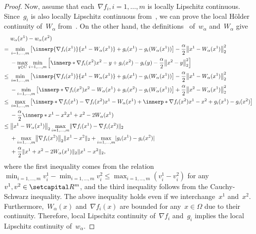 \documentclass[../../main]{subfiles}
\begin{document}
\begin{proof}
               Now, assume that each~$\nabla f_i, i = 1, \dots, m$ is locally Lipschitz continuous.
               Since~$g_i$ is also locally Lipschitz continuous from~, we can prove the local H\"older continuity of~$W_\alpha$ from~.
               On the other hand, the definitions~ of~$w_\alpha$ and~$W_\alpha$ give
               \begin{align} 
                    &w_\alpha(x^1) - w_\alpha(x^2) \\
                   ={}& \min_{i = 1, \dots, m} \left[ \innerp{\nabla f_i(x^1)}{x^1 - W_\alpha(x^1)} + g_i(x^1) - g_i(W_\alpha(x^1)) \right] - \frac{\alpha}{2} \norm*{x^1 - W_\alpha(x^1)}_2^2 \\
                      &- \max_{y \in C} \min_{i = 1, \dots, m} \left[ \innerp*{\nabla f_i(x^2)}{x^2 - y} + g_i(x^2) - g_i(y) - \frac{\alpha}{2} \norm*{x^2 - y}_2^2 \right] \\
                   \le{}& \min_{i = 1, \dots, m} \left[ \innerp{\nabla f_i(x^1)}{x^1 - W_\alpha(x^1)} + g_i(x^1) - g_i(W_\alpha(x^1)) \right] - \frac{\alpha}{2} \norm*{x^1 - W_\alpha(x^1)}_2^2 \\
                        &- \min_{i = 1, \dots, m} \left[ \innerp*{\nabla f_i(x^2)}{x^2 - W_\alpha(x^1)} + g_i(x^2) - g_i(W_\alpha(x^1)) \right] + \frac{\alpha}{2} \norm*{x^2 - W_\alpha(x^1)}_2^2 \\
                   \le{}& \max_{i = 1, \dots, m} \left[ \innerp*{\nabla f_i(x^1) - \nabla f_i(x^2)}{x^1 - W_\alpha(x^1)} + \innerp*{\nabla f_i(x^2)}{x^1 - x^2} + g_i(x^1) - g_i(x^2) \right] \\
                        &- \frac{\alpha}{2} \innerp*{x^1 - x^2}{x^1 + x^2 - 2 W_\alpha(x^1)} \\
                   \le{}& \norm*{x^1 - W_\alpha(x^1)}_2 \max_{i = 1, \dots, m} \norm{\nabla f_i(x^1) - \nabla f_i(x^2)}_2 \\
                        &+ \max_{i = 1, \dots, m} \norm*{\nabla f_i(x^2)}_2 \norm{x^1 - x^2}_2 + \max_{i = 1, \dots, m} \abs{g_i(x^1) - g_i(x^2)} \\
                        &+ \frac{\alpha}{2} \norm{x^1 + x^2 - 2 W_\alpha(x^1)}_2 \norm{x^1 - x^2}_2
               ,\end{align} 
               where the first inequality comes from the relation~$\min_{i = 1, \dots, m} v^1_i - \min_{i = 1, \dots, m} v^2_i \le \max_{i = 1, \dots, m} (v^1_i - v^2_i)$ for any~$v^1, v^2 \in \setR^m$, and the third inequality follows from the Cauchy-Schwarz inequality.
               The above inequality holds even if we interchange~$x^1$ and~$x^2$.
               Furthermore,~$W_\alpha(x)$ and~$\nabla f_i(x)$ are bounded for any~$x \in \Omega$ due to their continuity.
               Therefore, local Lipschitz continuity of~$\nabla f_i$ and~$g_i$ implies the local Lipschitz continuity of~$w_\alpha$.
            \end{proof}
\end{document}
